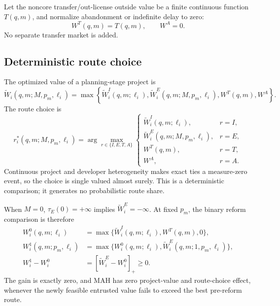 Let the noncore transfer/out-license outside value be a finite continuous
function \(T(q,m)\), and normalize abandonment or indefinite delay to zero:
\begin{equation}
  W^T(q,m)=T(q,m),
  \qquad
  W^A=0.
  \label{eq:p04-outside-values}
\end{equation}
No separate transfer market is added.

\subsection{Deterministic route choice}
\label{subsec:p04-deterministic-choice}

The optimized value of a planning-stage project is
\begin{equation}
  \widetilde W_i(q,m;M,p_m,\ell_i)
  =
  \max\left\{
    \widetilde W_i^I(q,m;\ell_i),
    \widetilde W_i^E(q,m;M,p_m,\ell_i),
    W^T(q,m),
    W^A
  \right\}.
  \label{eq:p04-optimized-value}
\end{equation}
The route choice is
\begin{equation}
  r_i^*(q,m;M,p_m,\ell_i)
  =
  \arg\max_{r\in\{I,E,T,A\}}
  \begin{cases}
    \widetilde W_i^I(q,m;\ell_i), & r=I,\\
    \widetilde W_i^E(q,m;M,p_m,\ell_i), & r=E,\\
    W^T(q,m), & r=T,\\
    W^A, & r=A.
  \end{cases}
  \label{eq:p04-route-choice}
\end{equation}
Continuous project and developer heterogeneity makes exact ties a
measure-zero event, so the choice is single valued almost surely. This is a
deterministic comparison; it generates no probabilistic route share.

When \(M=0\), \(\tau_E(0)=+\infty\) implies
\(\widetilde W_i^E=-\infty\).
At fixed \(p_m\), the binary reform comparison is therefore
\begin{equation}
  \begin{aligned}
  W_i^0(q,m;\ell_i)
  &=\max\{\widetilde W_i^I(q,m;\ell_i),W^T(q,m),0\},\\
  W_i^1(q,m;p_m,\ell_i)
  &=\max\{W_i^0(q,m;\ell_i),
    \widetilde W_i^E(q,m;1,p_m,\ell_i)\},\\
  W_i^1-W_i^0
  &=[\widetilde W_i^E-W_i^0]_+\geq0.
  \end{aligned}
  \label{eq:p04-binary-value-effect}
\end{equation}
The gain is exactly zero, and MAH has zero project-value and route-choice
effect, whenever the newly
feasible entrusted value fails to exceed the best pre-reform route.

